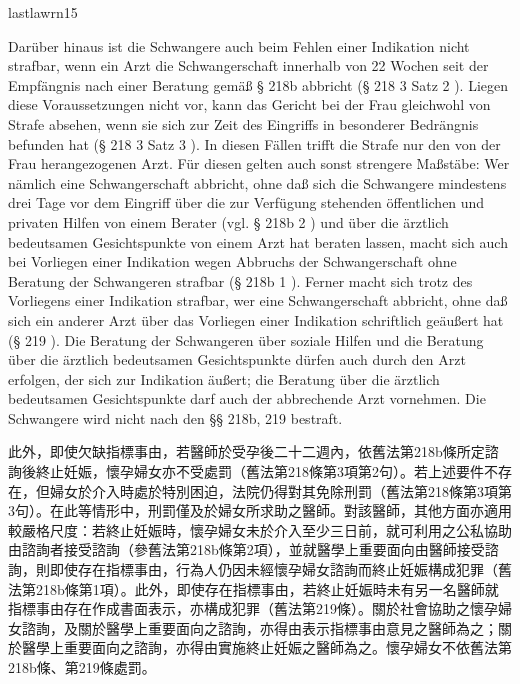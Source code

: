 \documentclass[12pt]{article}
\begin{document}
\begin{transboxpara}
\begin{lawboxpart}{last}{lawrn15}
\end{lawboxpart}
\end{transboxpara}

\begin{sourcepara}[title={原文理由 A.I.2 續}]
Darüber hinaus ist die Schwangere auch beim Fehlen einer Indikation nicht strafbar, wenn ein Arzt die Schwangerschaft innerhalb von 22 Wochen seit der Empfängnis nach einer Beratung gemäß § 218b \abbrStGB{} \abbrAF{} abbricht (§ 218 \abbrAbs{} 3 Satz 2 \abbrStGB{} \abbrAF{}). Liegen diese Voraussetzungen nicht vor, kann das Gericht bei der Frau gleichwohl von Strafe absehen, wenn sie sich zur Zeit des Eingriffs in besonderer Bedrängnis befunden hat (§ 218 \abbrAbs{} 3 Satz 3 \abbrStGB{} \abbrAF{}). In diesen Fällen trifft die Strafe nur den von der Frau herangezogenen Arzt. Für diesen gelten auch sonst strengere Maßstäbe: Wer nämlich eine Schwangerschaft abbricht, ohne daß sich die Schwangere mindestens drei Tage vor dem Eingriff über die zur Verfügung stehenden öffentlichen und privaten Hilfen von einem Berater (vgl. § 218b \abbrAbs{} 2 \abbrStGB{} \abbrAF{}) und über die ärztlich bedeutsamen Gesichtspunkte von einem Arzt hat beraten lassen, macht sich auch bei Vorliegen einer Indikation wegen Abbruchs der Schwangerschaft ohne Beratung der Schwangeren strafbar (§ 218b \abbrAbs{} 1 \abbrStGB{} \abbrAF{}). Ferner macht sich trotz des Vorliegens einer Indikation strafbar, wer eine Schwangerschaft abbricht, ohne daß sich ein anderer Arzt über das Vorliegen einer Indikation schriftlich geäußert hat (§ 219 \abbrStGB{} \abbrAF{}). Die Beratung der Schwangeren über soziale Hilfen und die Beratung über die ärztlich bedeutsamen Gesichtspunkte dürfen auch durch den Arzt erfolgen, der sich zur Indikation äußert; die Beratung über die ärztlich bedeutsamen Gesichtspunkte darf auch der abbrechende Arzt vornehmen. Die Schwangere wird nicht nach den §§ 218b, 219 \abbrStGB{} \abbrAF{} bestraft.
\end{sourcepara}
\begin{transpara}
此外，即使欠缺指標事由，若醫師於受孕後二十二週內，依舊法第218b條所定諮詢後終止妊娠，懷孕婦女亦不受處罰（舊法第218條第3項第2句）。若上述要件不存在，但婦女於介入時處於特別困迫，法院仍得對其免除刑罰（舊法第218條第3項第3句）。在此等情形中，刑罰僅及於婦女所求助之醫師。對該醫師，其他方面亦適用較嚴格尺度：若終止妊娠時，懷孕婦女未於介入至少三日前，就可利用之公私協助由諮詢者接受諮詢（參舊法第218b條第2項），並就醫學上重要面向由醫師接受諮詢，則即使存在指標事由，行為人仍因未經懷孕婦女諮詢而終止妊娠構成犯罪（舊法第218b條第1項）。此外，即使存在指標事由，若終止妊娠時未有另一名醫師就指標事由存在作成書面表示，亦構成犯罪（舊法第219條）。關於社會協助之懷孕婦女諮詢，及關於醫學上重要面向之諮詢，亦得由表示指標事由意見之醫師為之；關於醫學上重要面向之諮詢，亦得由實施終止妊娠之醫師為之。懷孕婦女不依舊法第218b條、第219條處罰。
\end{transpara}
\end{document}

